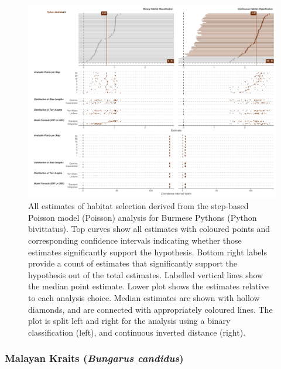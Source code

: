 \documentclass[10pt,a4paper]{article}
\begin{document}
\begin{figure}
\includegraphics[width=1\linewidth]{../../figures/specCurve_Python bivittatus_pois} \caption{All estimates of habitat selection derived from the step-based Poisson model (Poisson) analysis for Burmese Pythons (Python bivittatus). Top curves show all estimates with coloured points and corresponding confidence intervals indicating whether those estimates significantly support the hypothesis. Bottom right labels provide a count of estimates that significantly support the hypothesis out of the total estimates. Labelled vertical lines show the median point estimate. Lower plot shows the estimates relative to each analysis choice. Median estimates are shown with hollow diamonds, and are connected with appropriately coloured lines. The plot is split left and right for the analysis using a binary classification (left), and continuous inverted distance (right).}\label{fig:specCurvePoisPYBI}
\end{figure}

\subsubsection{\texorpdfstring{Malayan Kraits (\emph{Bungarus candidus})}{Malayan Kraits (Bungarus candidus)}}\label{malayan-kraits-bungarus-candidus}
\end{document}
